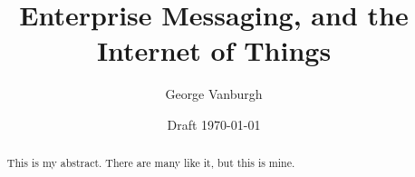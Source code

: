 \documentclass[a4paper,12pt,titlepage]{report}
\title{Enterprise Messaging, and the Internet of Things}
\author{George Vanburgh}
\date{Draft \today}
\begin{document}
  \maketitle

  \begin{abstract}
    This is my abstract. There are many like it, but this is mine.
  \end{abstract}

  \tableofcontents
\end{document}
